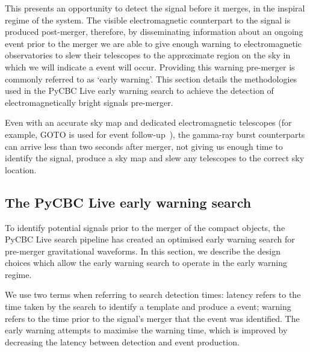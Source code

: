 This presents an opportunity to detect the \gwadj signal before it merges, in the inspiral regime of the system. The visible electromagnetic counterpart to the \gwadj signal is produced post-merger, therefore, by disseminating information about an ongoing \gwadj event prior to the merger we are able to give enough warning to electromagnetic observatories to slew their telescopes to the approximate region on the sky in which we will indicate a \gwadj event will occur. Providing this warning pre-merger is commonly referred to as `early warning'. This section details the methodologies used in the PyCBC Live early warning search to achieve the detection of electromagnetically bright \gwadj signals pre-merger.

Even with an accurate sky map and dedicated electromagnetic telescopes (for example, GOTO is used for \gwadj event follow-up~\cite{GOTO:2020}), the gamma-ray burst counterparts can arrive less than two seconds after merger, not giving us enough time to identify the signal, produce a sky map and slew any telescopes to the correct sky location.

\subsection{\label{6:sec:pycbc-ew-search}The PyCBC Live early warning search}

To identify potential \gwadj signals prior to the merger of the compact objects, the PyCBC Live search pipeline has created an optimised early warning search for pre-merger gravitational waveforms. In this section, we describe the design choices which allow the early warning search to operate in the early warning regime.

We use two terms when referring to search detection times: latency refers to the time taken by the search to identify a \gwadj template and produce a \gwadj event; warning refers to the time prior to the \gwadj signal's merger that the event was identified. The early warning attempts to maximise the warning time, which is improved by decreasing the latency between detection and event production.

